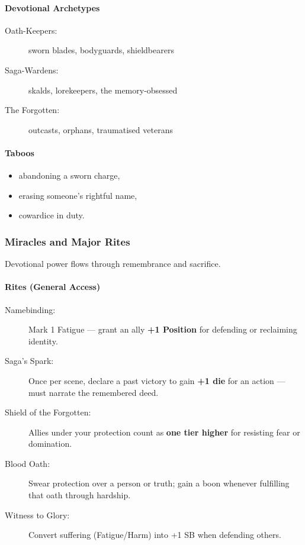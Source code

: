 \documentclass[11pt]{article}
\begin{document}
\paragraph*{Devotional Archetypes}
\begin{description}
    \item[Oath-Keepers:] sworn blades, bodyguards, shieldbearers
    \item[Saga-Wardens:] skalds, lorekeepers, the memory-obsessed
    \item[The Forgotten:] outcasts, orphans, traumatised veterans
\end{description}

\paragraph*{Taboos}
\begin{itemize}
    \item abandoning a sworn charge,
    \item erasing someone's rightful name,
    \item cowardice in duty.
\end{itemize}

\subsubsection{Miracles and Major Rites}
Devotional power flows through remembrance and sacrifice.

\paragraph*{Rites (General Access)}
\begin{description}
    \item[Namebinding:] Mark 1 Fatigue --- grant an ally \textbf{+1 Position} for defending or reclaiming identity.
    \item[Saga's Spark:] Once per scene, declare a past victory to gain \textbf{+1 die} for an action --- must narrate the remembered deed.
    \item[Shield of the Forgotten:] Allies under your protection count as \textbf{one tier higher} for resisting fear or domination.
    \item[Blood Oath:] Swear protection over a person or truth; gain a boon whenever fulfilling that oath through hardship.
    \item[Witness to Glory:] Convert suffering (Fatigue/Harm) into +1 SB when defending others.
\end{description}
\end{document}
